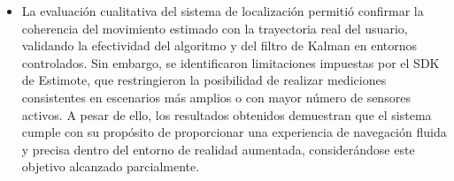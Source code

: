 \begin{itemize}
\item La evaluación cualitativa del sistema de localización permitió confirmar la coherencia del movimiento estimado con la trayectoria real del usuario, validando la efectividad del algoritmo y del filtro de Kalman en entornos controlados. Sin embargo, se identificaron limitaciones impuestas por el SDK de Estimote, que restringieron la posibilidad de realizar mediciones consistentes en escenarios más amplios o con mayor número de sensores activos. A pesar de ello, los resultados obtenidos demuestran que el sistema cumple con su propósito de proporcionar una experiencia de navegación fluida y precisa dentro del entorno de realidad aumentada, considerándose este objetivo alcanzado parcialmente.

\end{itemize}